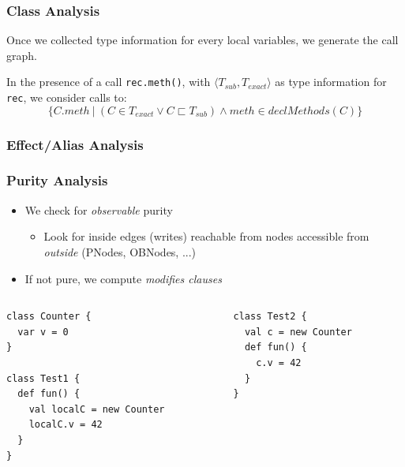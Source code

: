 \documentclass[hyperref={pdfpagelabels=false}]{beamer}
\begin{document}
\begin{frame}[fragile]
    \frametitle{Class Analysis}
    Once we collected type information for every local variables, we generate
    the call graph.

    In the presence of a call \lstinline{rec.meth()}, with
    $\langle T_{sub}, T_{exact} \rangle$ as type information for \lstinline{rec},
    we consider calls to:
    $$
    \{ C.meth ~|~ (C \in T_{exact} \lor C \sqsubset T_{sub}) \land meth \in declMethods(C)\}
    $$
\end{frame}

\begin{frame}
    \frametitle{Effect/Alias Analysis}
\end{frame}

\begin{frame}[fragile]
    \frametitle{Purity Analysis}
    \begin{itemize}
        \item We check for \emph{observable} purity
            \begin{itemize}
                \item Look for inside edges (writes) reachable from nodes
accessible from \emph{outside} (PNodes, OBNodes, ...)
            \end{itemize}
        \item If not pure, we compute \emph{modifies clauses}
    \end{itemize}

    \begin{columns}
      \begin{column}{0.5\textwidth}
\begin{lstlisting}
class Counter {
  var v = 0
}

class Test1 {
  def fun() {
    val localC = new Counter
    localC.v = 42
  }
}
\end{lstlisting}
      \end{column}
      \begin{column}{0.5\textwidth}
\begin{lstlisting}
class Test2 {
  val c = new Counter
  def fun() {
    c.v = 42
  }
}
\end{lstlisting}
      \end{column}
    \end{columns}
\end{frame}
\end{document}
